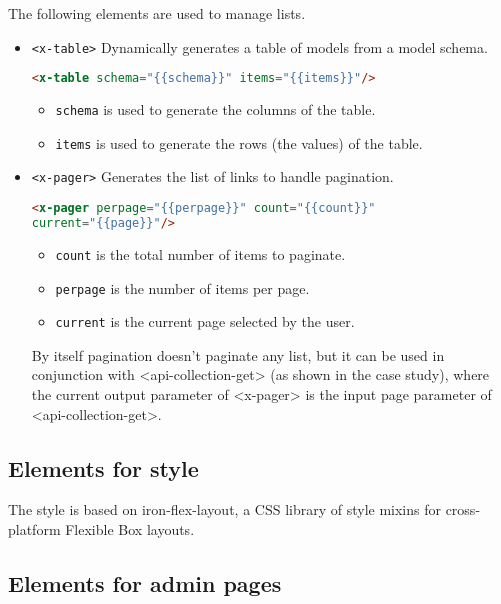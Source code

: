 The following elements are used to manage lists.
\begin{itemize}

\item \texttt{<x-table>} Dynamically generates a table of models from a model schema.
\begin{lstlisting}[language=html]
<x-table schema="{{schema}}" items="{{items}}"/>
\end{lstlisting}
\begin{itemize}
\item \texttt{schema} is used to generate the columns of the table. 
\item \texttt{items} is used to generate the rows (the values) of the table.
\end{itemize}

\item \texttt{<x-pager>} Generates the list of links to handle pagination.
\begin{lstlisting}[language=html]
<x-pager perpage="{{perpage}}" count="{{count}}" 
current="{{page}}"/>
\end{lstlisting}
\begin{itemize}
\item \texttt{count} is the total number of items to paginate.
\item \texttt{perpage} is the number of items per page.
\item \texttt{current} is the current page selected by the user.
\end{itemize}

By itself pagination doesn’t paginate any list, but it can be used in conjunction with <api-collection-get> (as shown in the case study), where the current output parameter of <x-pager> is the input page parameter of  <api-collection-get>.

\end{itemize}

\subsection{Elements for style}

The style is based on iron-flex-layout, a CSS library of style mixins for cross-platform Flexible Box layouts.

\subsection{Elements for admin pages}

